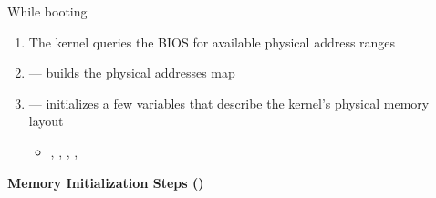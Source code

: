 \begin{frame}%
  \begin{block}{While booting}
    \begin{enumerate}
    \item The kernel queries the BIOS for available physical address ranges
    \item {} --- builds the physical addresses map
    \item {} --- initializes a few variables that describe the
      kernel's physical memory layout
      \begin{itemize}
      \item {}, , ,
        , 
      \end{itemize}
    \end{enumerate}
  \end{block}
\end{frame}

\textbf{Memory Initialization Steps (\cite[Sec 3.4]{mauerer2008professional})}

\begin{center}
  \begin{varwidth}{.9\textwidth}
  \end{varwidth}
\end{center}

